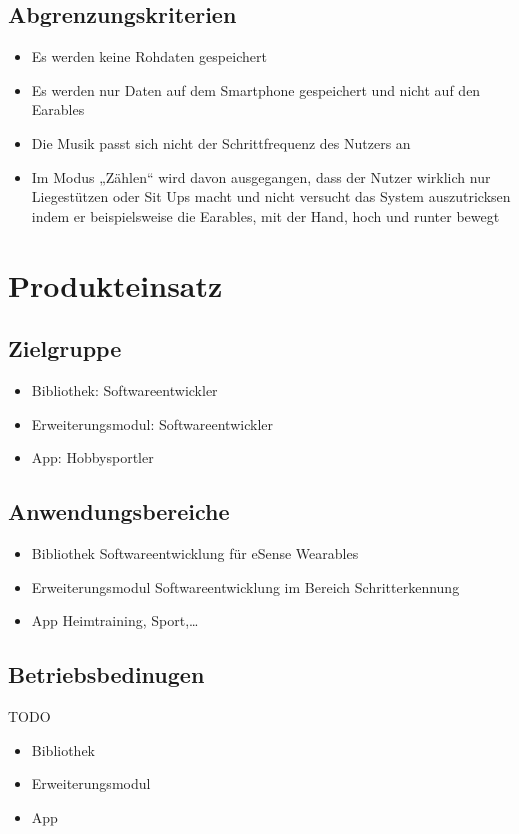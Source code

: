 \documentclass[a4paper,12pt]{article}
\begin{document}
  \subsection{Abgrenzungskriterien}
  \begin{itemize}
    \item\text Es werden keine Rohdaten gespeichert
    \item\text Es werden nur Daten auf dem Smartphone gespeichert und nicht auf den Earables
    \item\text Die Musik passt sich nicht der Schrittfrequenz des Nutzers an
    \item\text Im Modus „Zählen“ wird davon ausgegangen, dass der Nutzer wirklich nur Liegestützen oder Sit Ups macht und nicht versucht das System auszutricksen indem er beispielsweise die Earables, mit der Hand, hoch und runter bewegt
  \end{itemize}

\section{Produkteinsatz}
  \subsection{Zielgruppe}
  \begin{itemize}
    \item\textsf{Bibliothek:} Softwareentwickler
    \item\textsf{Erweiterungsmodul:} Softwareentwickler
    \item\textsf{App:} Hobbysportler
  \end{itemize}
  \subsection{Anwendungsbereiche}
    \begin{itemize}
      \item\textsf{Bibliothek} Softwareentwicklung für eSense Wearables
      \item\textsf{Erweiterungsmodul} Softwareentwicklung im Bereich Schritterkennung
      \item\textsf{App} Heimtraining, Sport,\dots
    \end{itemize}
  \subsection{Betriebsbedinugen}
  TODO
    \begin{itemize}
      \item\textsf{Bibliothek} 
      \item\textsf{Erweiterungsmodul}
      \item\textsf{App}
    \end{itemize}
\end{document}
